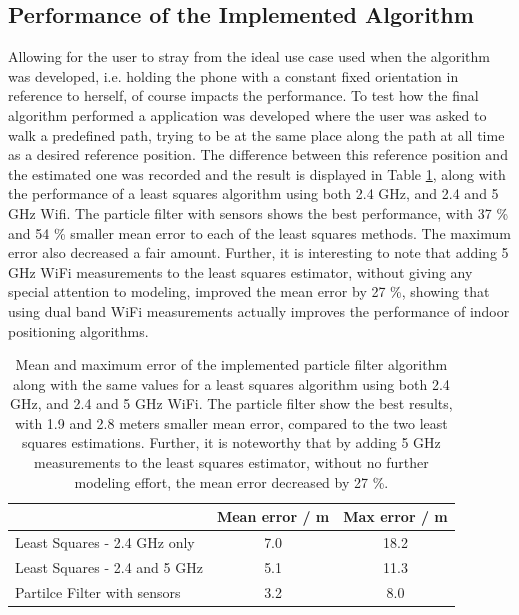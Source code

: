 \documentclass{LTHthesis}
\begin{document}
\subsection{Performance of the Implemented Algorithm}
%
Allowing for the user to stray from the ideal use case used when the algorithm was developed, i.e. holding the phone with a constant fixed orientation in reference to herself, of course impacts the performance. To test how the final algorithm performed a application was developed where the user was asked to walk a predefined path, trying to be at the same place along the path at all time as a desired reference position. The difference between this reference position and the estimated one was recorded and the result is displayed in Table \ref{table:imp_err}, along with the performance of a least squares algorithm using both 2.4 GHz, and 2.4 and 5 GHz Wifi. The particle filter with sensors shows the best performance, with 37 \% and 54 \% smaller mean error to each of the least squares methods. The maximum error also decreased a fair amount. Further, it is interesting to note that adding 5 GHz WiFi measurements to the least squares estimator, without giving any special attention to modeling, improved the mean error by 27 \%, showing that using dual band WiFi measurements actually improves the performance of indoor positioning algorithms. 

\begin{table}[h!bt]
\begin{center}
\begin{tabular}{|l|c|c|}
\cline{2-3}
\multicolumn{1}{c|}{ } & Mean error / m & Max error / m \\
\hline
Least Squares - 2.4 GHz only & 7.0 & 18.2\\
\hline
Least Squares - 2.4 and 5 GHz & 5.1 & 11.3 \\
\hline
Partilce Filter with sensors & 3.2 & 8.0 \\
\hline
\end{tabular}
\end{center}
\caption{Mean and maximum error of the implemented particle filter algorithm along with the same values for a least squares algorithm using both 2.4 GHz, and 2.4 and 5 GHz WiFi. The particle filter show the best results, with 1.9 and 2.8 meters smaller mean error, compared to the two least squares estimations. Further, it is noteworthy that by adding 5 GHz measurements to the least squares estimator, without no further modeling effort, the mean error decreased by 27 \%.}\label{table:imp_err}
\end{table}    
%
\end{document}
